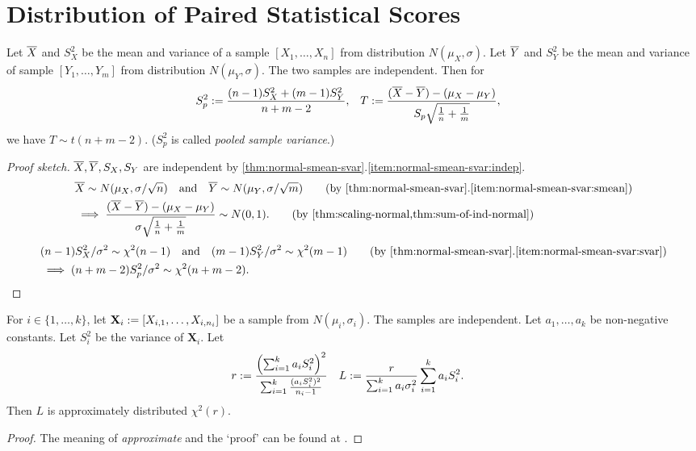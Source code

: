 \documentclass[a4paper, 12pt, fleqn]{article}
\begin{document}
\section{Distribution of Paired Statistical Scores}

\begin{theorem}
Let $\overline{X}$ and $S_X^2$ be the mean and variance of a sample $[X_1, \ldots, X_n]$
from distribution $N(\mu_X, \sigma)$.
Let $\overline{Y}$ and $S_Y^2$ be the mean and variance of sample $[Y_1, \ldots, Y_m]$
from distribution $N(\mu_Y, \sigma)$. The two samples are independent.
Then for
\begin{align*}
S_p^2 &:= \frac{(n-1)S_X^2 + (m-1)S_Y^2}{n+m-2},
& T &:= \frac{(\overline{X}-\overline{Y}) - (\mu_X-\mu_Y)}{S_p\sqrt{\frac{1}{n} + \frac{1}{m}}},
\end{align*}
we have $T \sim t(n+m-2)$. ($S_p^2$ is called \emph{pooled sample variance}.)
\end{theorem}
\begin{proof}[Proof sketch]
$\overline{X}, \overline{Y}, S_X, S_Y$ are independent by
\cref{thm:normal-smean-svar}.\ref{item:normal-smean-svar:indep}.
\begin{align*}
& \Xbar \sim N(\mu_X, \sigma/\sqrt{n}) \quad\textrm{and}\quad \Ybar \sim N(\mu_Y, \sigma/\sqrt{m})
    \tag{by \cref{thm:normal-smean-svar}.\ref{item:normal-smean-svar:smean}}
\\ &\implies \frac{(\Xbar - \Ybar) - (\mu_X - \mu_Y)}{\sigma\sqrt{\frac{1}{n} + \frac{1}{m}}} \sim N(0, 1).
    \tag{by \cref{thm:scaling-normal,thm:sum-of-ind-normal}}
\end{align*}
\begin{align*}
& (n-1)S_X^2/\sigma^2 \sim \chi^2(n-1) \quad\textrm{and}\quad (m-1)S_Y^2/\sigma^2 \sim \chi^2(m-1)
    \tag{by \cref{thm:normal-smean-svar}.\ref{item:normal-smean-svar:svar}}
\\ &\implies (n+m-2)S_p^2/\sigma^2 \sim \chi^2(n+m-2).
\qedhere \end{align*}
\end{proof}

\begin{lemma}
\label{thm:svar-lincomb}
For $i \in \{1, \ldots, k\}$, let $\mathbf{X}_i := [X_{i,1}, \ldots, X_{i,n_i}]$
be a sample from $N(\mu_i, \sigma_i)$. The samples are independent.
Let $a_1, \ldots, a_k$ be non-negative constants.
Let $S_i^2$ be the variance of $\mathbf{X}_i$. Let
\begin{align*}
r &:= \frac{\left(\sum_{i=1}^k a_iS_i^2\right)^2}{\sum_{i=1}^k \frac{(a_iS_i^2)^2}{n_i-1}}
& L &:= \frac{r}{\sum_{i=1}^k a_i\sigma_i^2}\sum_{i=1}^k a_iS_i^2.
\end{align*}
Then $L$ is approximately distributed $\chi^2(r)$.
\end{lemma}
\begin{proof}
The meaning of \emph{approximate} and the `proof' can be found at \cite{se.math.3189589,welch}.
\end{proof}
\end{document}

